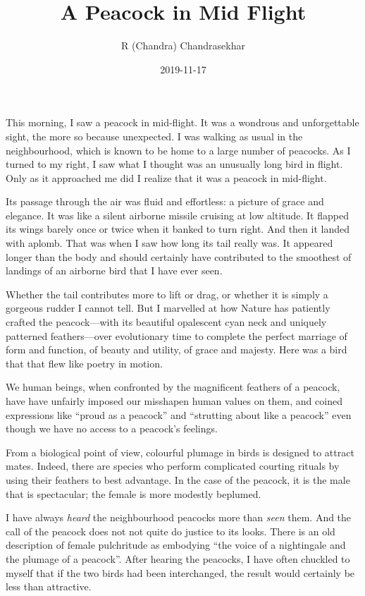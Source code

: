 \documentclass[
  11pt,
  british,
  a4paper,
]{article}
\title{A Peacock in Mid Flight}
\author{R (Chandra) Chandrasekhar}
\date{2019-11-17}
\begin{document}
\maketitle

\thispagestyle{empty}


This morning, I saw a peacock in mid-flight. It was a wondrous and
unforgettable sight, the more so because unexpected. I was walking as
usual in the neighbourhood, which is known to be home to a large number
of peacocks. As I turned to my right, I saw what I thought was an
unusually long bird in flight. Only as it approached me did I realize
that it was a peacock in mid-flight.

Its passage through the air was fluid and effortless: a picture of grace
and elegance. It was like a silent airborne missile cruising at low
altitude. It flapped its wings barely once or twice when it banked to
turn right. And then it landed with aplomb. That was when I saw how long
its tail really was. It appeared longer than the body and should
certainly have contributed to the smoothest of landings of an airborne
bird that I have ever seen.

Whether the tail contributes more to lift or drag, or whether it is
simply a gorgeous rudder I cannot tell. But I marvelled at how Nature
has patiently crafted the peacock---with its beautiful opalescent cyan
neck and uniquely patterned feathers---over evolutionary time to
complete the perfect marriage of form and function, of beauty and
utility, of grace and majesty. Here was a bird that that flew like
poetry in motion.

We human beings, when confronted by the magnificent feathers of a
peacock, have have unfairly imposed our misshapen human values on them,
and coined expressions like ``proud as a peacock'' and ``strutting about
like a peacock'' even though we have no access to a peacock's feelings.

From a biological point of view, colourful plumage in birds is designed
to attract mates. Indeed, there are species who perform complicated
courting rituals by using their feathers to best advantage. In the case
of the peacock, it is the male that is spectacular; the female is more
modestly beplumed.

I have always \emph{heard} the neighbourhood peacocks more than
\emph{seen} them. And the call of the peacock does not not quite do
justice to its looks. There is an old description of female pulchritude
as embodying ``the voice of a nightingale and the plumage of a
peacock''. After hearing the peacocks, I have often chuckled to myself
that if the two birds had been interchanged, the result would certainly
be less than attractive.
\end{document}
